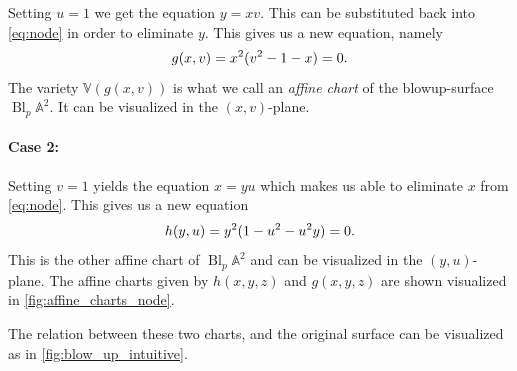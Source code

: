 \documentclass{article}
\newcommand{\A}{\ensuremath{\mathbb{A}}}
\newcommand{\V}{\ensuremath{\mathbb{V}}}
\DeclareMathOperator{\Bl}{Bl}
\begin{document}
\begin{example}
        Setting $u = 1$ we get the equation $y = xv$. This can be substituted
        back into \cref{eq:node} in order to eliminate $y$. This gives us a new
        equation, namely
        \begin{equation}
            \notag
            g(x, v) = x^2(v^2 - 1 - x) = 0.
        \end{equation}
        The variety $\V(g(x, v))$ is what we call an \emph{affine
        chart} of the blowup-surface $\Bl_p\A^2$. It can be
        visualized in the $(x, v)$-plane.

        \paragraph{Case 2:}
        \label{par:case_2}
        
        Setting $v = 1$ yields the equation $x = yu$ which makes us able to
        eliminate $x$ from \cref{eq:node}. This gives us a new equation
        \begin{equation}
            \notag
            h(y, u) = y^2(1 - u^2 - u^2y) = 0.
        \end{equation}
        This is the other affine chart of $\Bl_p\A^2$ and can be visualized in
        the $(y, u)$-plane.  The affine charts given by $h(x, y, z)$ and $g(x,
        y, z)$ are shown visualized in \cref{fig:affine_charts_node}.
        
        The relation between these two charts, and the original surface can be
        visualized as in \cref{fig:blow_up_intuitive}.


\end{example}
\end{document}

